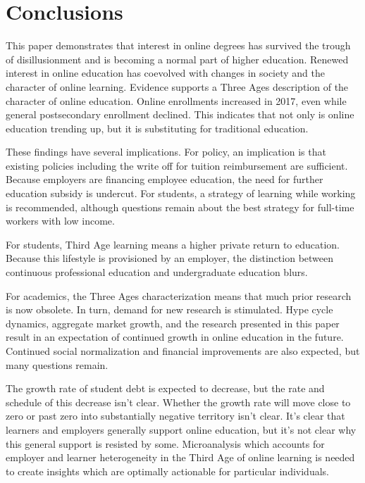 \documentclass[review]{elsarticle}
\begin{document}
\section{Conclusions}

This paper demonstrates that interest in online degrees has survived the trough of disillusionment
and is becoming a normal part of higher education.
Renewed interest in online education has coevolved with changes in society and the character of
online learning. Evidence supports a Three Ages description of the character of online education.
Online enrollments increased in 2017, even while general postsecondary enrollment declined\cite{lederman2018online}.
This indicates that not only is online education trending up, but it is substituting for traditional education.

These findings have several implications. For policy, an implication is that existing policies
including the write off for tuition reimbursement are sufficient.
Because employers are financing employee education, the need for further education subsidy is undercut.
For students, a strategy of learning while working is recommended,
although questions remain about the best strategy for full-time workers with low income.

For students, Third Age learning means a higher private return to education.
Because this lifestyle is provisioned by an employer,
the distinction between continuous professional education and undergraduate education blurs.

For academics, the Three Ages characterization means that much prior research is now obsolete.
In turn, demand for new research is stimulated.
Hype cycle dynamics, aggregate market growth, and the research presented in this paper
result in an expectation of continued growth in online education in the future.
Continued social normalization and financial improvements are also expected,
but many questions remain.

The growth rate of student debt is expected to decrease, but the rate and schedule of this decrease isn't clear.
Whether the growth rate will move close to zero or past zero into substantially negative territory isn't clear.
It's clear that learners and employers generally support online education,
but it's not clear why this general support is resisted by some.
Microanalysis which accounts for employer and learner heterogeneity in the Third Age
of online learning is needed to create insights which are optimally actionable for particular individuals.


\end{document}

